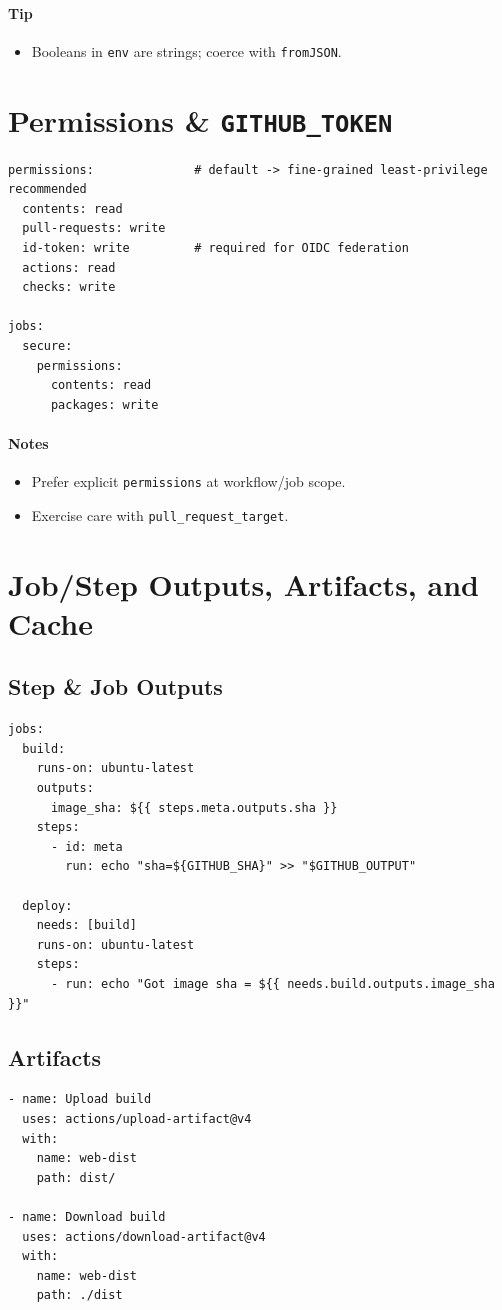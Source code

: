 \documentclass[11pt]{article}
\begin{document}
\paragraph{Tip}
\begin{itemize}
  \item Booleans in \texttt{env} are strings; coerce with \texttt{fromJSON}.
\end{itemize}

\section{Permissions \& \texttt{GITHUB\_TOKEN}}
\begin{verbatim}
permissions:              # default -> fine-grained least-privilege recommended
  contents: read
  pull-requests: write
  id-token: write         # required for OIDC federation
  actions: read
  checks: write

jobs:
  secure:
    permissions:
      contents: read
      packages: write
\end{verbatim}
\paragraph{Notes}
\begin{itemize}
  \item Prefer explicit \texttt{permissions} at workflow/job scope.
  \item Exercise care with \texttt{pull\_request\_target}.
\end{itemize}

\section{Job/Step Outputs, Artifacts, and Cache}
\subsection{Step \& Job Outputs}
\begin{verbatim}
jobs:
  build:
    runs-on: ubuntu-latest
    outputs:
      image_sha: ${{ steps.meta.outputs.sha }}
    steps:
      - id: meta
        run: echo "sha=${GITHUB_SHA}" >> "$GITHUB_OUTPUT"

  deploy:
    needs: [build]
    runs-on: ubuntu-latest
    steps:
      - run: echo "Got image sha = ${{ needs.build.outputs.image_sha }}"
\end{verbatim}

\subsection{Artifacts}
\begin{verbatim}
- name: Upload build
  uses: actions/upload-artifact@v4
  with:
    name: web-dist
    path: dist/

- name: Download build
  uses: actions/download-artifact@v4
  with:
    name: web-dist
    path: ./dist
\end{verbatim}
\end{document}
